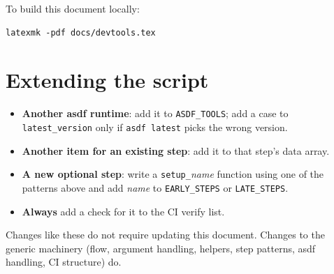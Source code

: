 \documentclass[11pt,a4paper]{article}
\newcommand{\cmd}[1]{\texttt{#1}}
\begin{document}
\noindent To build this document locally:

\begin{lstlisting}
latexmk -pdf docs/devtools.tex
\end{lstlisting}

\section{Extending the script}
\begin{itemize}
\item \textbf{Another asdf runtime}: add it to \cmd{ASDF\_TOOLS}; add a case to
  \cmd{latest\_version} only if \cmd{asdf latest} picks the wrong version.
\item \textbf{Another item for an existing step}: add it to that step's data array.
\item \textbf{A new optional step}: write a \cmd{setup\_}\textit{name} function using one
  of the patterns above and add \textit{name} to \cmd{EARLY\_STEPS} or \cmd{LATE\_STEPS}.
\item \textbf{Always} add a check for it to the CI verify list.
\end{itemize}

\noindent Changes like these do not require updating this document. Changes to the
generic machinery (flow, argument handling, helpers, step patterns, asdf handling,
CI structure) do.
\end{document}
